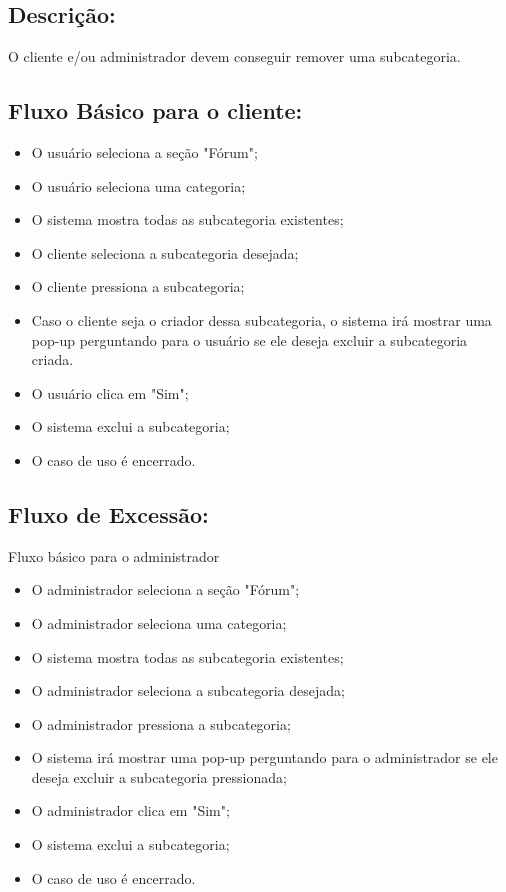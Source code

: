 \subsection{Descrição:}
O cliente e/ou administrador devem conseguir remover uma subcategoria. 
\subsection{Fluxo Básico para o cliente:}

\begin{itemize}
    \item O usuário seleciona a seção "Fórum";
    \item O usuário seleciona uma categoria;
    \item O sistema mostra todas as subcategoria existentes;
    \item O cliente seleciona a subcategoria desejada;
    \item O cliente pressiona a subcategoria;
    \item Caso o cliente seja o criador dessa subcategoria, o sistema irá mostrar uma pop-up perguntando para o usuário se ele deseja excluir a subcategoria criada. 
    \item O usuário clica em "Sim";
    \item O sistema exclui a subcategoria;
    \item O caso de uso é encerrado. 
\end{itemize}
\subsection{Fluxo de Excessão:}
Fluxo básico para o administrador
\begin{itemize}
    \item O administrador seleciona a seção "Fórum";
    \item O administrador seleciona uma categoria;
    \item O sistema mostra todas as subcategoria existentes;
    \item O administrador seleciona a subcategoria desejada;
    \item O administrador pressiona a subcategoria;
    \item O sistema irá mostrar uma pop-up perguntando para o administrador se ele deseja excluir a subcategoria pressionada;
    \item O administrador clica em "Sim";
    \item O sistema exclui a subcategoria;
    \item O caso de uso é encerrado. 
\end{itemize}
